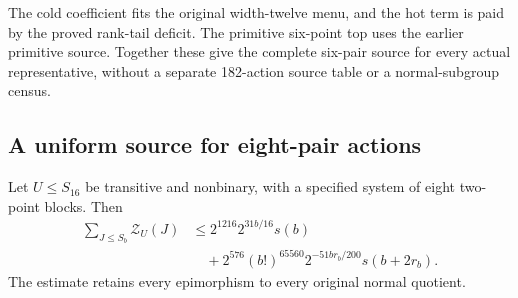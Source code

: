 The cold coefficient fits the original width-twelve menu, and the hot
term is paid by the proved rank-tail deficit. The primitive six-point
top uses the earlier primitive source. Together these give the complete
six-pair source for every actual representative, without a separate
182-action source table or a normal-subgroup census.

\subsection{A uniform source for eight-pair actions}

\begin{proposition}\label{prop:uniform-eight-pair-source}
Let $U\leq S_{16}$ be transitive and nonbinary, with a specified system
of eight two-point blocks. Then
\begin{align*}
 \sum_{J\leq S_b}\mathcal Z_U(J)
 &\leq 2^{1216}2^{31b/16}s(b)\\
 &\quad+2^{576}(b!)^{65560}2^{-51br_b/200}s(b+2r_b).
\end{align*}
The estimate retains every epimorphism to every original normal quotient.
\end{proposition}
